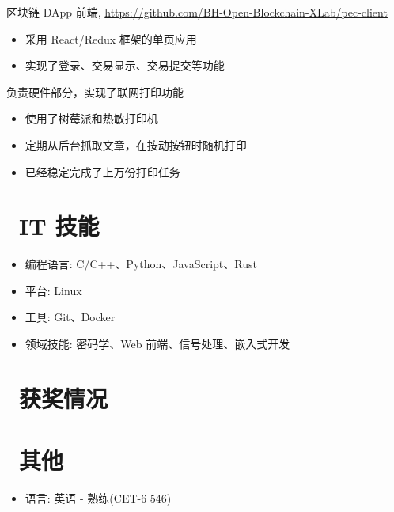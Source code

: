 \documentclass{resume}
\newcommand{\hlink}[1]{\href{#1}{#1}}
\begin{document}
\begin{onehalfspacing}
区块链 DApp 前端, \hlink{https://github.com/BH-Open-Blockchain-XLab/pec-client}
\begin{itemize}
  \item 采用 React/Redux 框架的单页应用
  \item 实现了登录、交易显示、交易提交等功能
\end{itemize}
\end{onehalfspacing}

\begin{onehalfspacing}
负责硬件部分，实现了联网打印功能
\begin{itemize}
  \item 使用了树莓派和热敏打印机
  \item 定期从后台抓取文章，在按动按钮时随机打印
  \item 已经稳定完成了上万份打印任务
\end{itemize}
\end{onehalfspacing}


\section{\faCogs\ IT 技能}
\begin{itemize}[parsep=0.5ex]
  \item 编程语言: C/C++、Python、JavaScript、Rust
  \item 平台: Linux
  \item 工具: Git、Docker
  \item 领域技能: 密码学、Web 前端、信号处理、嵌入式开发
\end{itemize}

\section{\faHeartO\ 获奖情况}

\section{\faInfo\ 其他}
\begin{itemize}[parsep=0.5ex]
  \item 语言: 英语 - 熟练(CET-6 546)
\end{itemize}
\end{document}
